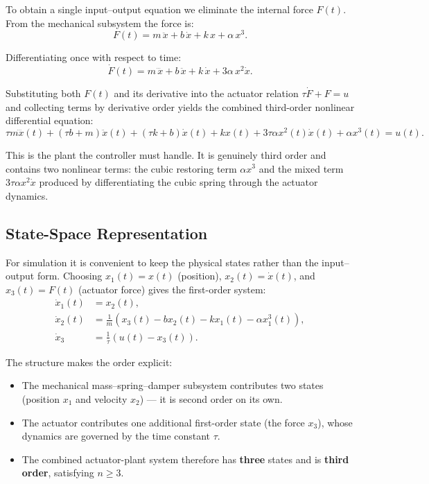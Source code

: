 \documentclass[12pt]{article}
\begin{document}
\noindent To obtain a single input--output equation we eliminate the internal force \(F(t)\). From the mechanical subsystem the force is:
\[
F(t) = m\,\ddot{x} + b\,\dot{x} + k\,x + \alpha\,x^3.
\]

\noindent Differentiating once with respect to time:
\[
\dot{F}(t) = m\,\dddot{x} + b\,\ddot{x} + k\,\dot{x} + 3\alpha\,x^2\dot{x}.
\]

\noindent Substituting both \(F(t)\) and its derivative into the actuator relation \(\tau\dot{F} + F = u\) and collecting terms by derivative order yields the combined third-order nonlinear differential equation:
\[
\boxed{
\tau m\dddot{x}(t)+
(\tau b+m)\ddot{x}(t)+(\tau k+b)\dot{x}(t)+kx(t)+3\tau\alpha x^2(t)\dot{x}(t)+\alpha x^3(t)=u(t).
}
\]

\noindent This is the plant the controller must handle. It is genuinely third order and contains two nonlinear terms: the cubic restoring term \(\alpha x^3\) and the mixed term \(3\tau\alpha x^2\dot{x}\) produced by differentiating the cubic spring through the actuator dynamics.

\subsection{State-Space Representation}

\noindent For simulation it is convenient to keep the physical states rather than the input--output form. Choosing \(x_1(t)= x(t)\) (position), \(x_2(t) = \dot{x}(t)\), and \(x_3(t) = F(t)\) (actuator force) gives the first-order system:
\[
\boxed{
\begin{aligned}
\dot{x}_1(t) &= x_2(t),\\
\dot{x}_2(t) &= \frac{1}{m}\left(x_3(t) - b x_2(t) - k x_1(t) - \alpha x_1^3(t)\right),\\
\dot{x}_3 &= \frac{1}{\tau}\left(u(t) - x_3(t)\right).
\end{aligned}
}
\]

\noindent The structure makes the order explicit:
\begin{itemize}
    \item The mechanical mass--spring--damper subsystem contributes two states (position \(x_1\) and velocity \(x_2\)) --- it is second order on its own.
    \item The actuator contributes one additional first-order state (the force \(x_3\)), whose dynamics are governed by the time constant \(\tau\).
    \item The combined actuator-plant system therefore has \textbf{three} states and is \textbf{third order}, satisfying \(n \geq 3\).
\end{itemize}
\end{document}
